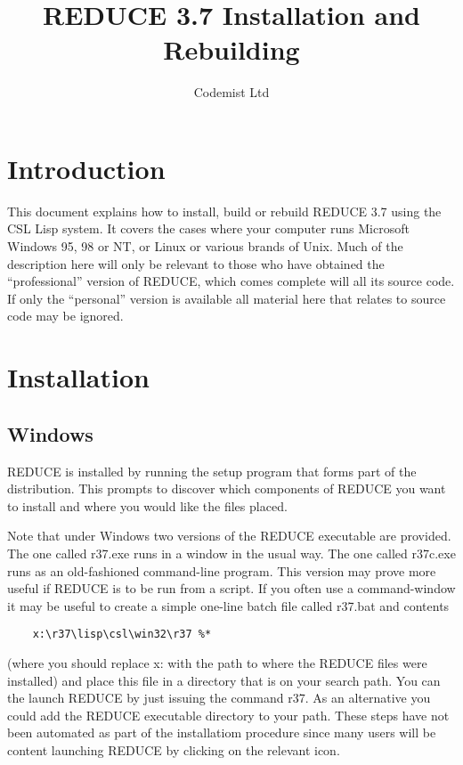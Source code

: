 \documentclass[a4paper,11pt]{article}
\title{REDUCE 3.7 Installation and Rebuilding}
\author{Codemist Ltd}
\begin{document}
\maketitle
\section{Introduction}
This document explains how to install, build or rebuild REDUCE 3.7
using the CSL Lisp system.  It covers the cases where your computer
runs Microsoft Windows 95, 98 or NT, or Linux or various brands of
Unix.  Much of the description here will only be relevant to those
who have obtained the ``professional'' version of REDUCE, which comes
complete will all its source code. If only the ``personal'' version is
available all material here that relates to source code may be ignored.

\section{Installation}
\subsection{Windows}
REDUCE is installed by running the {\ttfamily setup} program that forms
part of the distribution. This prompts to discover which components of
REDUCE you want to install and where you would like the files placed.

Note that under Windows two versions of the REDUCE executable are provided.
The one called {\ttfamily r37.exe} runs in a window in the usual way. The
one called {\ttfamily r37c.exe} runs as an old-fashioned command-line
program. This version may prove more useful if REDUCE is to be run from
a script.  If you often use a command-window it may be useful to create
a simple one-line batch file called {\ttfamily r37.bat} and contents
\begin{verbatim}
    x:\r37\lisp\csl\win32\r37 %*
\end{verbatim}
\noindent (where you should replace {\ttfamily x:} with the path to where
the REDUCE files were installed) and place this file in a directory
that is on your search path. You can the launch REDUCE by just issuing
the command {\ttfamily r37}. As an alternative you could add the REDUCE
executable directory to your path. These steps have not been automated
as part of the installatiom procedure since many users will be content
launching REDUCE by clicking on the relevant icon.
\end{document}
